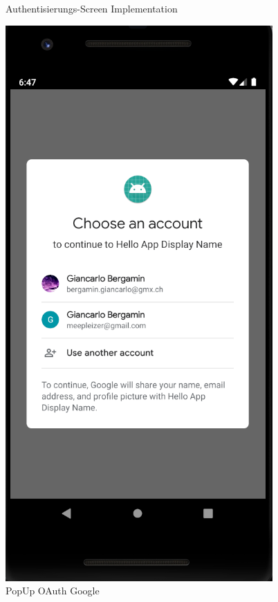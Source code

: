 \begin{figure}[H]
\begin{minipage}[b]{0.4\textwidth}
    \caption{Authentisierungs-Screen Implementation}
    \label{fig:loginscreen_3}
  \end{minipage}
  \hfill
  \begin{minipage}[b]{0.4\textwidth}
    \includegraphics[width=\textwidth]{images/signinwithgoogle_implementation2.PNG}
    \caption{PopUp OAuth Google}
    \label{fig:oauth}
  \end{minipage}
\end{figure}

